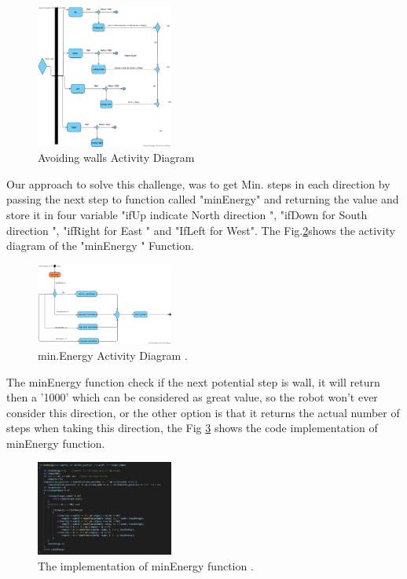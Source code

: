 \documentclass[conference]{IEEEtran}
\begin{document}
\begin{figure}[!h]
	\centering
	\includegraphics[width=0.4\textwidth]{wall.png}
	\caption{\label{wallAct}Avoiding walls  Activity Diagram }
	
\end{figure}


Our approach to solve this challenge, was to get  Min. steps in each direction by passing the next step to function called "minEnergy" and returning the value and store it in four variable "ifUp indicate North direction ", "ifDown for South direction ", "ifRight for East " and "IfLeft for West". The Fig.\ref{MinEnAct}shows  the activity diagram of the "minEnergy " Function. 

\begin{figure}[!h]
	
	\centering
	\includegraphics[width=0.4\textwidth]{MinEnergy.png}
	\caption{\label{MinEnAct}min.Energy Activity Diagram .}
	
\end{figure}



The minEnergy function check if the next potential step is wall, it will return then a '1000' which can be considered as great value, so the robot won't ever consider this direction, or the other option is that it returns the actual number of steps when taking this direction, the Fig \ref{MinEnCode} shows the code implementation of minEnergy function.


\begin{figure}[!h]
	
	\centering
	\includegraphics[width=0.4\textwidth]{MinEnergyCode.png}
	\caption{\label{MinEnCode}The implementation of minEnergy function  .}
	
\end{figure}
\end{document}

